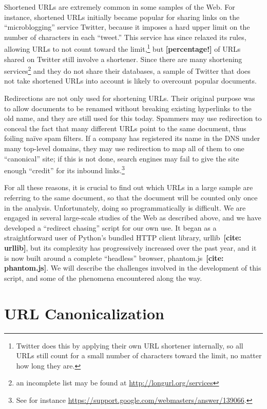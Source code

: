 \documentclass[oneside]{zarticle}
\def\todo#1{{\color{todocolor}\bfseries [#1]}}
\def\needcite#1{\todo{cite: #1}}
\begin{document}
Shortened URLs are extremely common in some samples of the Web.  For
instance, shortened URLs initially became popular for sharing links on
the “microblogging” service Twitter, because it imposes a hard upper
limit on the number of characters in each “tweet.”  This service has
since relaxed its rules, allowing URLs to not count toward the
limit,\footnote{Twitter does this by applying their own URL shortener
  internally, so all URLs still count for a small number of characters
  toward the limit, no matter how long they are.} but \todo{percentage!}
of URLs shared on Twitter still involve a shortener.  Since there are
many shortening services\footnote{an incomplete list may be found at
  \url{http://longurl.org/services}} and they do not share their
databases, a sample of Twitter that does not take shortened URLs into
account is likely to overcount popular documents.

Redirections are not only used for shortening URLs.  Their original
purpose was to allow documents to be renamed without breaking existing
hyperlinks to the old name, and they are still used for this today.
Spammers may use redirection to conceal the fact that many different
URLs point to the same document, thus foiling naïve spam filters.  If
a company has registered its name in the DNS under many top-level
domains, they may use redirection to map all of them to one
“canonical” site; if this is not done, search engines may fail to give
the site enough “credit” for its inbound links.\footnote{See for
  instance \url{https://support.google.com/webmasters/answer/139066}.}

For all these reasons, it is crucial to find out which URLs in a large
sample are referring to the same document, so that the document will
be counted only once in the analysis.  Unfortunately, doing so
programmatically is difficult.  We are engaged in several large-scale
studies of the Web as described above, and we have developed a
“redirect chasing” script for our own use.  It began as a
straightforward user of Python's bundled HTTP client library,
\textsf{urllib}~\needcite{urllib}, but its complexity has
progressively increased over the past year, and it is now built around
a complete “headless” browser,
\textsf{phantom.js}~\needcite{phantom.js}.  We will describe the
challenges involved in the development of this script, and some of the
phenomena encountered along the way.

\section{URL Canonicalization}
\end{document}
